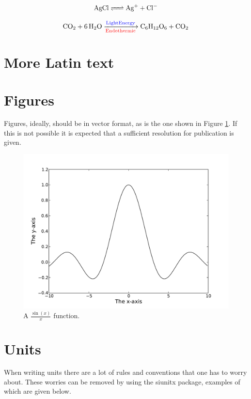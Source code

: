 \begin{equation}
\ce{AgCl <=> Ag+ + Cl-}
\end{equation}

\begin{equation}
\ce{CO2 + 6H2O ->[\textcolor{blue}{Light Energy}][\textcolor{red}{Endothermic}] C6H12O6 + CO2}
\end{equation}


\section{More Latin text}

\lipsum[1-4]

\section{Figures}

Figures, ideally, should be in vector format, as is the one shown in Figure \ref{fig:vectorFig}. If this is not possible it is expected that a sufficient resolution for publication is given.

\begin{figure}[h!]
\includegraphics[width=0.5 \textwidth]{figs/sinc1.pdf}
\caption{A $\frac{\sin(x)}{x}$ function.}
\label{fig:vectorFig}
\end{figure}

\section{Units}

When writing units there are a lot of rules and conventions that one has to worry about. These worries can be removed by using the siunitx package, examples of which are given below.

